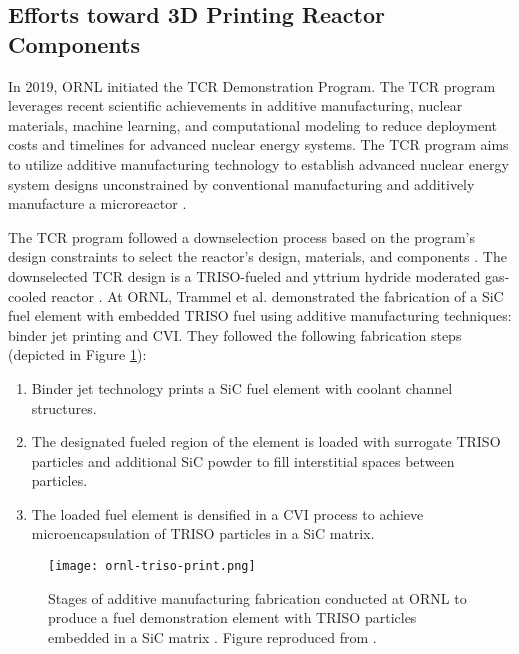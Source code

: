 \subsection{Efforts toward 3D Printing Reactor Components}
In 2019, \gls{ORNL} initiated the \gls{TCR} Demonstration Program.
The \gls{TCR} program leverages recent scientific achievements in additive 
manufacturing, nuclear materials, machine learning, and computational modeling
to reduce deployment costs and timelines for advanced nuclear energy systems. 
The \gls{TCR} program aims to utilize additive manufacturing technology to 
establish advanced nuclear energy system designs unconstrained by conventional 
manufacturing and additively manufacture a microreactor 
\cite{terrani_transformational_2019}. 

The \gls{TCR} program followed a downselection process based on the program's 
design constraints to select the reactor's design, materials, and components
\cite{betzler_transformational_2020}.
The downselected TCR design is a TRISO-fueled and yttrium hydride moderated 
gas-cooled reactor \cite{betzler_transformational_2020}.
At \gls{ORNL}, Trammel et al. \cite{trammell_advanced_2019} demonstrated 
the fabrication of a SiC fuel element with embedded \gls{TRISO} fuel using 
additive manufacturing techniques: binder jet printing and \gls{CVI}. 
They followed the following fabrication steps (depicted in Figure 
\ref{fig:ornl-triso-print}): 
\begin{enumerate}
    \item Binder jet technology prints a SiC fuel element with coolant channel 
    structures. 
    \item The designated fueled region of the element is loaded with surrogate 
    \gls{TRISO} particles and additional SiC powder to fill interstitial spaces
    between particles. 
    \item The loaded fuel element is densified in a \gls{CVI} process to achieve 
    microencapsulation of \gls{TRISO} particles in a SiC matrix. 
\end{enumerate}
\begin{figure}[htb!]
    \centering
    \texttt{[image: ornl-triso-print.png]} 
    \caption{Stages of additive manufacturing fabrication conducted at \acrlong{ORNL} to 
    produce a fuel demonstration element with \gls{TRISO} particles embedded in 
    a SiC matrix \cite{trammell_advanced_2019}. Figure reproduced from 
    \cite{trammell_advanced_2019}.}
    \label{fig:ornl-triso-print}
\end{figure}
